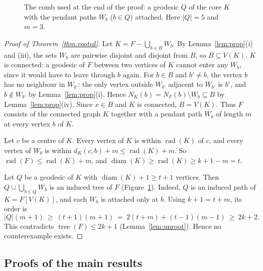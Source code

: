 \documentclass[11pt,a4paper]{article}
\theoremstyle{remark}
\newcommand{\rad}{\operatorname{rad}}
\newcommand{\diam}{\operatorname{diam}}
\newcommand{\tr}{\tree}
\newcommand{\tree}{\operatorname{tree}}
\begin{document}
\begin{figure}[t]
\centering
{}
\caption{The comb used at the end of the proof: a geodesic $Q$ of the core $K$ with the pendant paths $W_b$ ($b\in Q$) attached. Here $|Q|=5$ and $m=3$.}\label{fig:comb}
\end{figure}

\begin{proof}[Proof of Theorem~\ref{thm:rooted}]
Let $K=F-\bigcup_{b\in B}W_b$. By Lemma~\ref{lem:prop}(i) and (iii), the sets $W_b$ are pairwise disjoint and disjoint from $B$, so $B\subseteq V(K)$. $K$ is connected: a geodesic of $F$ between two vertices of $K$ cannot enter any $W_b$, since it would have to leave through $b$ again. For $b\in B$ and $b'\ne b$, the vertex $b$ has no neighbour in $W_{b'}$: the only vertex outside $W_{b'}$ adjacent to $W_{b'}$ is $b'$, and $b\notin W_{b'}$ by Lemma~\ref{lem:prop}(i). Hence $N_K(b)=N_F(b)\setminus W_b\subseteq B$ by Lemma~\ref{lem:prop}(iv). Since $x\in B$ and $K$ is connected, $B=V(K)$. Thus $F$ consists of the connected graph $K$ together with a pendant path $W_b$ of length $m$ at every vertex $b$ of $K$.

Let $c$ be a centre of $K$. Every vertex of $K$ is within $\rad(K)$ of $c$, and every vertex of $W_b$ is within $d_K(c,b)+m\le\rad(K)+m$. So $\rad(F)\le\rad(K)+m$, and $\diam(K)\ge\rad(K)\ge k+1-m=t$.

Let $Q$ be a geodesic of $K$ with $\diam(K)+1\ge t+1$ vertices. Then $Q\cup\bigcup_{b\in Q}W_b$ is an induced tree of $F$ (Figure~\ref{fig:comb}). Indeed, $Q$ is an induced path of $K=F[V(K)]$, and each $W_b$ is attached only at $b$. Using $k+1=t+m$, its order is
\[
|Q|(m+1)\ \ge\ (t+1)(m+1)\ =\ 2(t+m)+(t-1)(m-1)\ \ge\ 2k+2 .
\]
This contradicts $\tr(F)\le2k+1$ (Lemma~\ref{lem:unroot}). Hence no counterexample exists.
\end{proof}

\subsection{Proofs of the main results}\label{sec:main}
\end{document}
